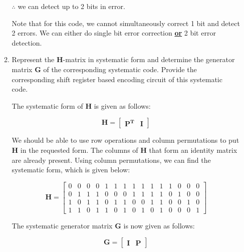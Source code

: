 \documentclass[fleqn]{article}
\begin{document}
\begin{enumerate}
\begin{enumerate}
			$\therefore$ we can detect up to 2 bits in error.
			
			Note that for this code, we cannot simultaneously correct 1 bit and detect 2 errors. We can either do single bit error correction \textbf{\underline{or}} 2 bit error detection.
			

			\pagebreak
			\item Represent the $\mathbf{H}$-matrix in systematic form and determine the generator matrix $\mathbf{G}$ of the corresponding systematic code. Provide the corresponding shift register based encoding circuit of this systematic code.
			
			The systematic form of $\mathbf{H}$ is given as follows:
			
			\begin{equation*}
				\mathbf{H} = \left[\begin{array}{c|c}
					\mathbf{P^T} & \mathbf{I}
				\end{array}\right]
			\end{equation*}
			
			We should be able to use row operations and column permutations to put $\mathbf{H}$ in the requested form. The columns of $\mathbf{H}$ that form an identity matrix are already present. Using column permutations, we can find the systematic form, which is given below:
			
			\begin{equation*}
				\mathbf{H} = \begin{bmatrix}
					0 & 0 & 0 & 0 & 1 & 1 & 1 & 1 & 1 & 1 & 1 & 1 & 0 & 0 & 0 \\
					0 & 1 & 1 & 1 & 0 & 0 & 0 & 1 & 1 & 1 & 1 & 0 & 1 & 0 & 0 \\
					1 & 0 & 1 & 1 & 0 & 1 & 1 & 0 & 0 & 1 & 1 & 0 & 0 & 1 & 0 \\
					1 & 1 & 0 & 1 & 1 & 0 & 1 & 0 & 1 & 0 & 1 & 0 & 0 & 0 & 1
				\end{bmatrix}
			\end{equation*}
		
			The systematic generator matrix $\mathbf{G}$ is now given as follows:
			
			\begin{equation*}
				\mathbf{G} = \left[\begin{array}{c|c}
					\mathbf{I} & \mathbf{P}
				\end{array}\right]
			\end{equation*}
			

\end{enumerate}
\end{enumerate}
\end{document}
